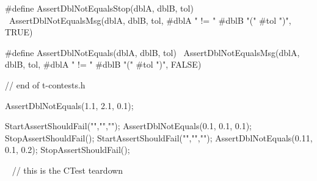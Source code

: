 #define AssertDblNotEqualsStop(dblA, dblB, tol) \
  AssertDblNotEqualsMsg(dblA, dblB, tol, #dblA " != " #dblB "(" #tol ")", TRUE)

#define AssertDblNotEquals(dblA, dblB, tol)    \
  AssertDblNotEqualsMsg(dblA, dblB, tol, #dblA " != " #dblB "(" #tol ")", FALSE)

// end of t-contests.h
\stopCHeader

\startCTest
AssertDblNotEquals(1.1, 2.1, 0.1);
\stopCTest
\stopTestCase

\startCTest
StartAssertShouldFail("","","");
  AssertDblNotEquals(0.1, 0.1, 0.1);
StopAssertShouldFail();
StartAssertShouldFail("","","");
  AssertDblNotEquals(0.11, 0.1, 0.2);
StopAssertShouldFail();
\stopCTest
\stopTestCase

\stopTestSuite

\CTestsTeardown\
\startCTest
  // this is the CTest teardown
\stopCTest
